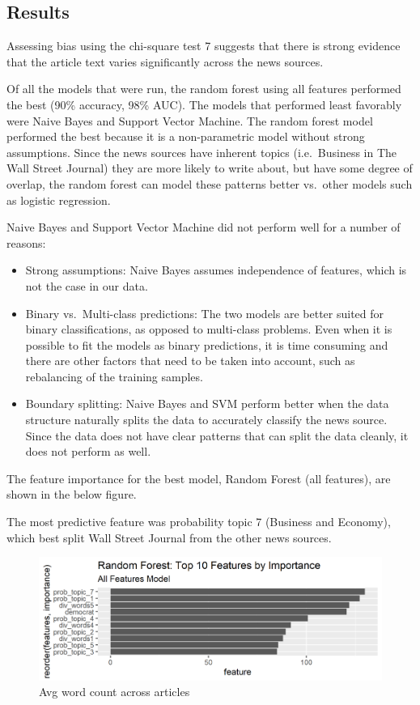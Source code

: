 \documentclass[
]{article}
\begin{document}
\hypertarget{results}{%
\subsection{Results}\label{results}}

Assessing bias using the chi-square test 7 suggests that there is strong
evidence that the article text varies significantly across the news
sources.

Of all the models that were run, the random forest using all features
performed the best (90\% accuracy, 98\% AUC). The models that performed
least favorably were Naive Bayes and Support Vector Machine. The random
forest model performed the best because it is a non-parametric model
without strong assumptions. Since the news sources have inherent topics
(i.e.~Business in The Wall Street Journal) they are more likely to write
about, but have some degree of overlap, the random forest can model
these patterns better vs.~other models such as logistic regression.

Naive Bayes and Support Vector Machine did not perform well for a number
of reasons:

\begin{itemize}
\item
  Strong assumptions: Naive Bayes assumes independence of features,
  which is not the case in our data.
\item
  Binary vs.~Multi-class predictions: The two models are better suited
  for binary classifications, as opposed to multi-class problems. Even
  when it is possible to fit the models as binary predictions, it is
  time consuming and there are other factors that need to be taken into
  account, such as rebalancing of the training samples.
\item
  Boundary splitting: Naive Bayes and SVM perform better when the data
  structure naturally splits the data to accurately classify the news
  source. Since the data does not have clear patterns that can split the
  data cleanly, it does not perform as well.
\end{itemize}

The feature importance for the best model, Random Forest (all features),
are shown in the below figure.

The most predictive feature was probability topic 7 (Business and
Economy), which best split Wall Street Journal from the other news
sources.

\begin{figure}
\centering
\includegraphics{../figures/rf_feature_importance.png}
\caption{Avg word count across articles}
\end{figure}
\end{document}
